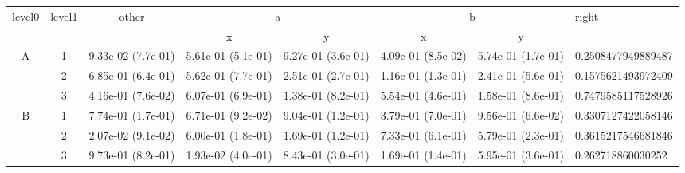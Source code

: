 \begin{tabular}{cccccccl}
\toprule
\multirow{2}{*}{level0} & \multirow{2}{*}{level1}& \multirow{2}{*}{other}&\multicolumn{2}{c}{a}&\multicolumn{2}{c}{b}& \multirow{2}{*}{right}\tabularnewline
\cmidrule(lr){4-5}
\cmidrule(lr){6-7}
&&&x&y&x&y\tabularnewline
\midrule
\multirow{3}{*}{A}&1& 9.33e-02 (7.7e-01)& 5.61e-01 (5.1e-01)& 9.27e-01 (3.6e-01)& 4.09e-01 (8.5e-02)& 5.74e-01 (1.7e-01)& 0.2508477949889487\tabularnewline
&2& 6.85e-01 (6.4e-01)& 5.62e-01 (7.7e-01)& 2.51e-01 (2.7e-01)& 1.16e-01 (1.3e-01)& 2.41e-01 (5.6e-01)& 0.1575621493972409\tabularnewline
&3& 4.16e-01 (7.6e-02)& 6.07e-01 (6.9e-01)& 1.38e-01 (8.2e-01)& 5.54e-01 (4.6e-01)& 1.58e-01 (8.6e-01)& 0.7479585117528926\tabularnewline
\midrule
\multirow{3}{*}{B}&1& 7.74e-01 (1.7e-01)& 6.71e-01 (9.2e-02)& 9.04e-01 (1.2e-01)& 3.79e-01 (7.0e-01)& 9.56e-01 (6.6e-02)& 0.3307127422058146\tabularnewline
&2& 2.07e-02 (9.1e-02)& 6.00e-01 (1.8e-01)& 1.69e-01 (1.2e-01)& 7.33e-01 (6.1e-01)& 5.79e-01 (2.3e-01)& 0.3615217546681846\tabularnewline
&3& 9.73e-01 (8.2e-01)& 1.93e-02 (4.0e-01)& 8.43e-01 (3.0e-01)& 1.69e-01 (1.4e-01)& 5.95e-01 (3.6e-01)& 0.262718860030252\tabularnewline
\bottomrule
\end{tabular}
